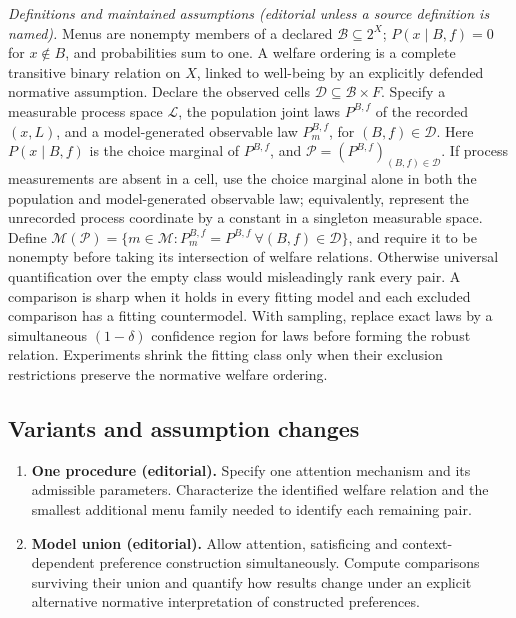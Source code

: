 \documentclass[11pt,a4paper]{article}
\begin{document}
\emph{Definitions and maintained assumptions (editorial unless a source definition is named).} Menus are nonempty members of a declared \(\mathcal B\subseteq2^X\); \(P(x\mid B,f)=0\) for \(x\notin B\), and probabilities sum to one. A welfare ordering is a complete transitive binary relation on \(X\), linked to well-being by an explicitly defended normative assumption. Declare the observed cells \(\mathcal D\subseteq\mathcal B\times F\). Specify a measurable process space \(\mathcal L\), the population joint laws \(P^{B,f}\) of the recorded \((x,L)\), and a model-generated observable law \(P_m^{B,f}\), for \((B,f)\in\mathcal D\). Here \(P(x\mid B,f)\) is the choice marginal of \(P^{B,f}\), and \(\mathcal P=(P^{B,f})_{(B,f)\in\mathcal D}\). If process measurements are absent in a cell, use the choice marginal alone in both the population and model-generated observable law; equivalently, represent the unrecorded process coordinate by a constant in a singleton measurable space. Define \(\mathcal M(\mathcal P)=\{m\in\mathcal M:P_m^{B,f}=P^{B,f}\ \forall(B,f)\in\mathcal D\}\), and require it to be nonempty before taking its intersection of welfare relations. Otherwise universal quantification over the empty class would misleadingly rank every pair. A comparison is sharp when it holds in every fitting model and each excluded comparison has a fitting countermodel. With sampling, replace exact laws by a simultaneous \((1-\delta)\) confidence region for laws before forming the robust relation. Experiments shrink the fitting class only when their exclusion restrictions preserve the normative welfare ordering.
\subsection*{Variants and assumption changes}
\begin{enumerate}
\item \textbf{One procedure (editorial).} Specify one attention mechanism and its admissible parameters. Characterize the identified welfare relation and the smallest additional menu family needed to identify each remaining pair.
\item \textbf{Model union (editorial).} Allow attention, satisficing and context-dependent preference construction simultaneously. Compute comparisons surviving their union and quantify how results change under an explicit alternative normative interpretation of constructed preferences.
\end{enumerate}
\end{document}
